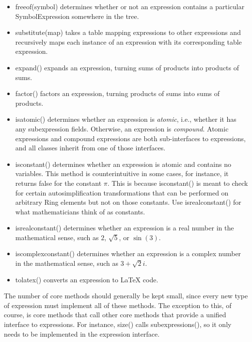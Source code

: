 \documentclass{article}
\begin{document}
\begin{itemize}
    \item {\ttfamily freeof(symbol)} determines whether or not an expression contains a particular \\ {\ttfamily SymbolExpression} somewhere in the tree.
    
    \item {\ttfamily substitute(map)} takes a table mapping expressions to other expressions and recursively maps each instance of an expression with its corresponding table expression.
    
    \item {\ttfamily expand()} expands an expression, turning sums of products into products of sums.
    
    \item {\ttfamily factor()} factors an expression, turning products of sums into sums of products.
    
    \item {\ttfamily isatomic()} determines whether an expression is \emph{atomic}, i.e., whether it has any subexpression fields. Otherwise, an expression is \emph{compound}. Atomic expressions and compound expressions are both sub-interfaces to expressions, and all classes inherit from one of those interfaces.
    
    \item {\ttfamily isconstant()} determines whether an expression is atomic and contains no variables. This method is counterintuitive in some cases, for instance, it returns {\ttfamily false} for the constant $\pi$. This is because {\ttfamily isconstant()} is meant to check for certain autosimplification  transformations that can be performed on arbitrary {\ttfamily Ring} elements but not on those constants. Use {\ttfamily isrealconstant()} for what mathematicians think of as constants.
    
    \item {\ttfamily isrealconstant()} determines whether an expression is a real number in the mathematical sense, such as $2$, $\sqrt{5}$, or $\sin(3)$.
    
    \item {\ttfamily iscomplexconstant()} determines whether an expression is a complex number in the mathematical sense, such as $3 + \sqrt{2}i$.
    
    \item {\ttfamily tolatex()} converts an expression to \LaTeX{} code.
\end{itemize}

The number of core methods should generally be kept small, since every new type of expression must implement all of these methods. The exception to this, of course, is core methods that call other core methods that provide a unified interface to expressions. For instance, {\ttfamily size()} calls {\ttfamily subexpressions()}, so it only needs to be implemented in the expression interface.
\end{document}
